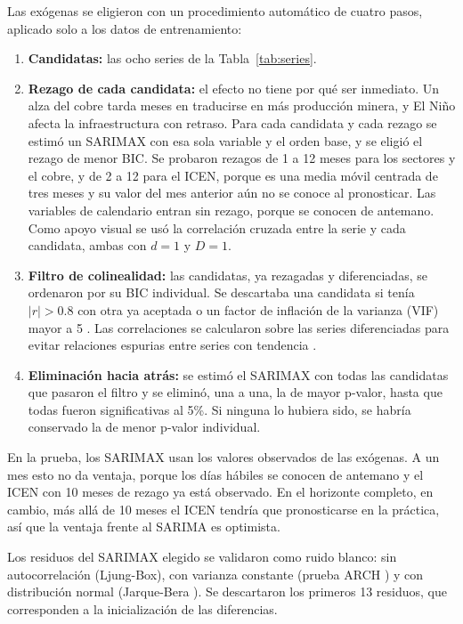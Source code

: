\documentclass[conference]{IEEEtran}
\begin{document}
Las exógenas se eligieron con un procedimiento automático de cuatro pasos, aplicado solo a los datos de entrenamiento:
\begin{enumerate}[leftmargin=*]
  \item \textbf{Candidatas:} las ocho series de la Tabla~\ref{tab:series}.
  \item \textbf{Rezago de cada candidata:} el efecto no tiene por qué ser inmediato. Un alza del cobre tarda meses en traducirse en más producción minera, y El Niño afecta la infraestructura con retraso. Para cada candidata y cada rezago se estimó un SARIMAX con esa sola variable y el orden base, y se eligió el rezago de menor BIC. Se probaron rezagos de 1 a 12 meses para los sectores y el cobre, y de 2 a 12 para el ICEN, porque es una media móvil centrada de tres meses y su valor del mes anterior aún no se conoce al pronosticar. Las variables de calendario entran sin rezago, porque se conocen de antemano. Como apoyo visual se usó la correlación cruzada entre la serie y cada candidata, ambas con $d=1$ y $D=1$.
  \item \textbf{Filtro de colinealidad:} las candidatas, ya rezagadas y diferenciadas, se ordenaron por su BIC individual. Se descartaba una candidata si tenía $|r|>0.8$ con otra ya aceptada o un factor de inflación de la varianza (VIF) mayor a 5 \cite{obrien2007}. Las correlaciones se calcularon sobre las series diferenciadas para evitar relaciones espurias entre series con tendencia \cite{granger1974}.
  \item \textbf{Eliminación hacia atrás:} se estimó el SARIMAX con todas las candidatas que pasaron el filtro y se eliminó, una a una, la de mayor p-valor, hasta que todas fueron significativas al 5\%. Si ninguna lo hubiera sido, se habría conservado la de menor p-valor individual.
\end{enumerate}

En la prueba, los SARIMAX usan los valores observados de las exógenas. A un mes esto no da ventaja, porque los días hábiles se conocen de antemano y el ICEN con 10 meses de rezago ya está observado. En el horizonte completo, en cambio, más allá de 10 meses el ICEN tendría que pronosticarse en la práctica, así que la ventaja frente al SARIMA es optimista.

Los residuos del SARIMAX elegido se validaron como ruido blanco: sin autocorrelación (Ljung-Box), con varianza constante (prueba ARCH \cite{engle1982}) y con distribución normal (Jarque-Bera \cite{jarque1980}). Se descartaron los primeros 13 residuos, que corresponden a la inicialización de las diferencias.
\end{document}
